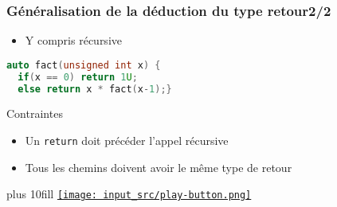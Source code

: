 \documentclass[C++.tex]{subfiles}
\begin{document}
\begin{frame}[fragile]
	\frametitle{Généralisation de la déduction du type retour\titlehfill{}2/2}
	\begin{itemize}
		\item Y compris récursive
	\end{itemize}

	\begin{lstlisting}[language=C++]
auto fact(unsigned int x) {
  if(x == 0) return 1U;
  else return x * fact(x-1);}\end{lstlisting}

	\begin{alertblock}{Contraintes}
		\begin{itemize}
			\item Un \lstinline|return| doit précéder l'appel récursive
			\item Tous les chemins doivent avoir le même type de retour
		\end{itemize}
	\end{alertblock}

	\vskip 10mm plus 10fill
	\hfill
	\href{https://godbolt.org/#g:!((g:!((g:!((h:codeEditor,i:(filename:'1',fontScale:14,fontUsePx:'0',j:1,lang:c%2B%2B,selection:(endColumn:1,endLineNumber:26,positionColumn:1,positionLineNumber:26,selectionStartColumn:1,selectionStartLineNumber:26,startColumn:1,startLineNumber:26),source:'%23include+%3Ciostream%3E%0A%0Astatic+auto+bar(int+x)%0A%7B%0A++if(x+%3E%3D+0)+return+2+*+x%3B%0A++else+return+-2+*+x%3B%0A%7D%0A%0Astatic+auto+fact(unsigned+int+x)%0A%7B%0A++if(x+%3D%3D+0)+return+1U%3B%0A++else+return+x+*+fact(x-1)%3B%0A%7D%0A%0Aint+main()%0A%7B%0A++%7B%0A++++std::cout+%3C%3C+bar(5)+%3C%3C+!'%5Cn!'%3B%0A++++std::cout+%3C%3C+bar(-2)+%3C%3C+!'%5Cn!'%3B%0A++%7D%0A%0A++%7B%0A++++std::cout+%3C%3C+fact(4)+%3C%3C+!'%5Cn!'%3B%0A++%7D%0A%7D%0A'),l:'5',n:'0',o:'C%2B%2B+source+%231',t:'0')),k:50,l:'4',n:'0',o:'',s:0,t:'0'),(g:!((h:executor,i:(argsPanelShown:'1',compilationPanelShown:'0',compiler:g112,compilerOutShown:'0',execArgs:'',execStdin:'',fontScale:14,fontUsePx:'0',j:1,lang:c%2B%2B,libs:!((name:boost,ver:'175')),options:'-std%3Dc%2B%2B14',source:1,stdinPanelShown:'1',tree:'1',wrap:'0'),l:'5',n:'0',o:'Executor+x86-64+gcc+11.2+(C%2B%2B,+Editor+%231)',t:'0')),header:(),k:50,l:'4',n:'0',o:'',s:0,t:'0')),l:'2',n:'0',o:'',t:'0')),version:4}{\texttt{[image: input\_src/play-button.png]}}
\end{frame}
\end{document}

